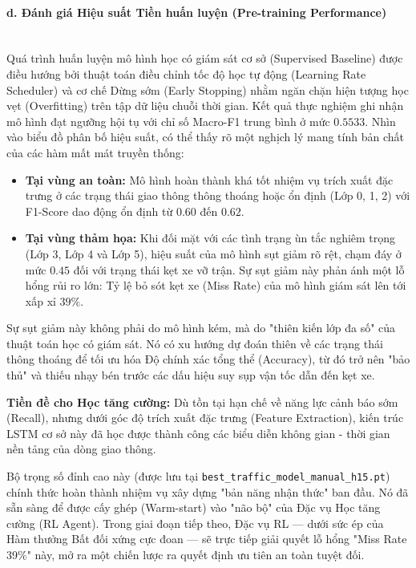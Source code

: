 \paragraph{d. Đánh giá Hiệu suất Tiền huấn luyện (Pre-training Performance)} \mbox{} \\
Quá trình huấn luyện mô hình học có giám sát cơ sở (Supervised Baseline) được điều hướng bởi thuật toán điều chỉnh tốc độ học tự động (Learning Rate Scheduler) và cơ chế Dừng sớm (Early Stopping) nhằm ngăn chặn hiện tượng học vẹt (Overfitting) trên tập dữ liệu chuỗi thời gian. Kết quả thực nghiệm ghi nhận mô hình đạt ngưỡng hội tụ với chỉ số Macro-F1 trung bình ở mức $0.5533$. Nhìn vào biểu đồ phân bố hiệu suất, có thể thấy rõ một nghịch lý mang tính bản chất của các hàm mất mát truyền thống:
\begin{itemize}
    \item \textbf{Tại vùng an toàn:} Mô hình hoàn thành khá tốt nhiệm vụ trích xuất đặc trưng ở các trạng thái giao thông thông thoáng hoặc ổn định (Lớp 0, 1, 2) với F1-Score dao động ổn định từ $0.60$ đến $0.62$.
    \item \textbf{Tại vùng thảm họa:} Khi đối mặt với các tình trạng ùn tắc nghiêm trọng (Lớp 3, Lớp 4 và Lớp 5), hiệu suất của mô hình sụt giảm rõ rệt, chạm đáy ở mức $0.45$ đối với trạng thái kẹt xe vỡ trận. Sự sụt giảm này phản ánh một lỗ hổng rủi ro lớn: Tỷ lệ bỏ sót kẹt xe (Miss Rate) của mô hình giám sát lên tới xấp xỉ $39\%$.
\end{itemize}
Sự sụt giảm này không phải do mô hình kém, mà do "thiên kiến lớp đa số" của thuật toán học có giám sát. Nó có xu hướng dự đoán thiên về các trạng thái thông thoáng để tối ưu hóa Độ chính xác tổng thể (Accuracy), từ đó trở nên "bảo thủ" và thiếu nhạy bén trước các dấu hiệu suy sụp vận tốc dẫn đến kẹt xe.

\textbf{Tiền đề cho Học tăng cường:} Dù tồn tại hạn chế về năng lực cảnh báo sớm (Recall), nhưng dưới góc độ trích xuất đặc trưng (Feature Extraction), kiến trúc LSTM cơ sở này đã học được thành công các biểu diễn không gian - thời gian nền tảng của dòng giao thông.

Bộ trọng số đỉnh cao này (được lưu tại \texttt{best\_traffic\_model\_manual\_h15.pt}) chính thức hoàn thành nhiệm vụ xây dựng "bản năng nhận thức" ban đầu. Nó đã sẵn sàng để được cấy ghép (Warm-start) vào "não bộ" của Đặc vụ Học tăng cường (RL Agent). Trong giai đoạn tiếp theo, Đặc vụ RL — dưới sức ép của Hàm thưởng Bất đối xứng cực đoan — sẽ trực tiếp giải quyết lỗ hổng "Miss Rate 39\%" này, mở ra một chiến lược ra quyết định ưu tiên an toàn tuyệt đối.

